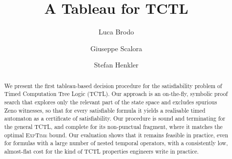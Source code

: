 \documentclass[runningheads]{llncs}
\begin{document}
\title{A Tableau for TCTL}


\author{Luca Brodo \and
Giuseppe Scalora \and
Stefan Henkler}
%
%
%
\maketitle              %
%
\begin{abstract}

We present the first tableau-based decision procedure for the satisfiability problem of Timed
Computation Tree Logic (TCTL). Our approach is an on-the-fly, symbolic proof search that explores only the relevant part of the state space and excludes spurious Zeno witnesses, so that for every satisfiable formula it yields a realisable timed automaton as a certificate of satisfiability. Our procedure is sound and terminating for the general TCTL, and complete for its non-punctual fragment, where it matches the optimal \textsc{ExpTime} bound. Our evaluation shows that it remains feasible in practice, even for formulas with a large number of nested temporal operators, with a consistently low, almost-flat cost for the kind of TCTL properties engineers write in practice.

\end{abstract}


%








\end{document}
